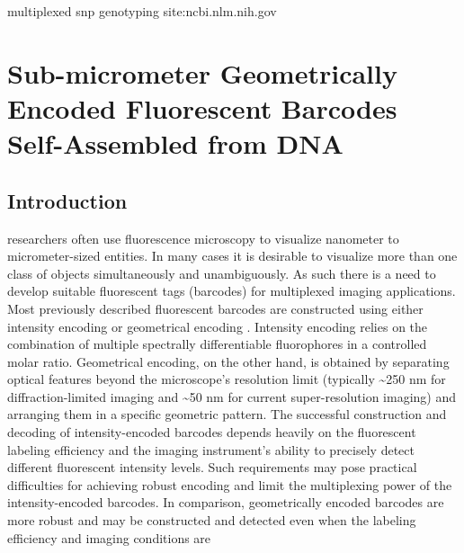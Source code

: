 



multiplexed snp genotyping site:ncbi.nlm.nih.gov

\chapter{Sub-micrometer Geometrically Encoded Fluorescent Barcodes Self-Assembled from DNA}

\section{Introduction}
 researchers often use fluorescence microscopy to visualize nanometer to micrometer-sized entities. In many cases it is desirable to visualize more than one class of objects simultaneously and unambiguously. As such there is a need to develop suitable 
fluorescent tags (barcodes) for multiplexed imaging applications. Most previously 
described fluorescent barcodes are constructed using either intensity encoding \citep{han_quantum-dot-tagged_2001,xu_multiplexed_2003,li_multiplexed_2005,livet_transgenic_2007,fournier-bidoz_facile_2008,lin_self-assembled_2007,marcon_--fly_2010} or 
geometrical encoding \citep{nicewarner-pena_submicrometer_2001,gudiksen_growth_2002,braeckmans_encoding_2003,dejneka_rare_2003,geiss_direct_2008,pregibon_multifunctional_2007,xiao_direct_2009,li_controlled_2010}. Intensity encoding relies on the combination of multiple 
spectrally differentiable fluorophores in a controlled molar ratio. Geometrical encoding, 
on the other hand, is obtained by separating optical features beyond the microscope’s 
resolution limit (typically \textasciitilde250 nm for diffraction-limited imaging and \textasciitilde 50 nm for 
current super-resolution imaging) and arranging them in a specific geometric pattern. The 
successful construction and decoding of intensity-encoded barcodes depends heavily on 
the fluorescent labeling efficiency and the imaging instrument’s ability to precisely detect 
different fluorescent intensity levels. Such requirements may pose practical difficulties 
for achieving robust encoding and limit the multiplexing power of the intensity-encoded 
barcodes. In comparison, geometrically encoded barcodes are more robust and may be 
constructed and detected even when the labeling efficiency and imaging conditions are 

